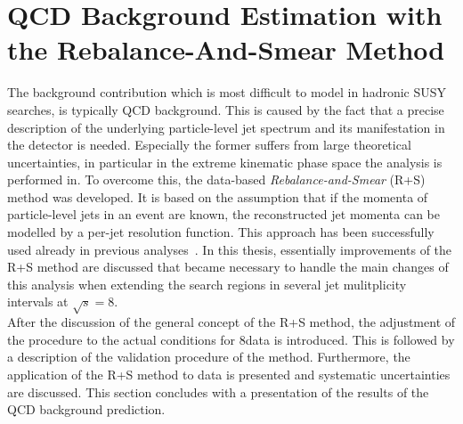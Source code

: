\section{QCD Background Estimation with the Rebalance-And-Smear Method}
\label{subsec:RA2_QCD}
The background contribution which is most difficult to model in hadronic SUSY searches, is typically QCD background. This is caused by the fact that a precise description of the underlying particle-level jet spectrum and its manifestation in the detector is needed. Especially the former suffers from large theoretical uncertainties, in particular in the extreme kinematic phase space the analysis is performed in. To overcome this, the data-based \textit{Rebalance-and-Smear} (R+S) method was developed. It is based on the assumption that if the momenta of particle-level jets in an event are known, the reconstructed jet momenta can be modelled by a per-jet resolution function. This approach has been successfully used already in previous analyses~\cite{springerlink:10.1007/JHEP08(2011)155, Chatrchyan:2012lia}. In this thesis, essentially improvements of the R+S method are discussed that became necessary to handle the main changes of this analysis when extending the search regions in several jet mulitplicity intervals at $\sqrt{s} = 8$\tev. \\
After the discussion of the general concept of the R+S method, the adjustment of the procedure to the actual conditions for 8\tev data is introduced. This is followed by a description of the validation procedure of the method. Furthermore, the application of the R+S method to data is presented and systematic uncertainties are discussed. This section concludes with a presentation of the results of the QCD background prediction. 

